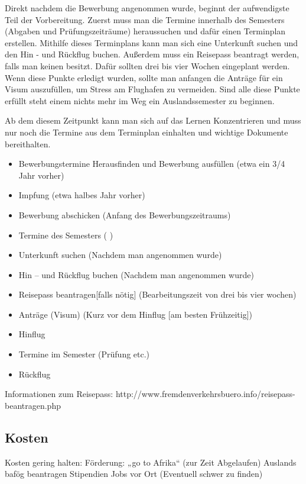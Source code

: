 \documentclass[11pt]{article}
\begin{document}
Direkt nachdem die Bewerbung angenommen wurde, beginnt der aufwendigste Teil der Vorbereitung. Zuerst muss man die Termine innerhalb des Semesters (Abgaben und Prüfungszeiträume) heraussuchen und dafür einen Terminplan erstellen.
Mithilfe dieses Terminplans kann man sich eine Unterkunft suchen und den Hin - und Rückflug buchen.  Außerdem muss ein Reisepass beantragt werden, falls man keinen besitzt. Dafür sollten drei bis vier Wochen eingeplant werden. Wenn diese Punkte erledigt wurden, sollte man anfangen die Anträge für ein Visum auszufüllen, um Stress am Flughafen zu vermeiden. Sind alle diese Punkte erfüllt steht einem nichts mehr im Weg ein Auslandssemester zu beginnen.

Ab dem diesem Zeitpunkt kann man sich auf das Lernen Konzentrieren und muss nur noch die Termine aus dem Terminplan einhalten und wichtige Dokumente bereithalten.

\begin{itemize}
\item Bewerbungstermine Herausfinden und Bewerbung ausfüllen (etwa ein 3/4 Jahr vorher)
\item Impfung					                           (etwa halbes Jahr vorher)
\item Bewerbung abschicken			(Anfang des Bewerbungszeitraums)
\item Termine des Semesters                                  ( )
\item Unterkunft suchen				(Nachdem man angenommen wurde)
\item Hin – und Rückflug buchen                           (Nachdem man angenommen wurde)
\item Reisepass beantragen[falls nötig]		(Bearbeitungszeit von drei bis vier wochen)
\item Anträge (Visum)				(Kurz vor dem Hinflug [am besten Frühzeitig])
\item Hinflug
\item Termine im Semester (Prüfung etc.)
\item Rückflug

\end{itemize}
Informationen zum Reisepass:
http://www.fremdenverkehrsbuero.info/reisepass-beantragen.php

\newpage

\subsection{Kosten}
Kosten gering halten:
Förderung: „go to Afrika“ (zur Zeit Abgelaufen)
Auslands bafög beantragen
Stipendien
Jobs vor Ort (Eventuell schwer zu finden)\\
\end{document}
